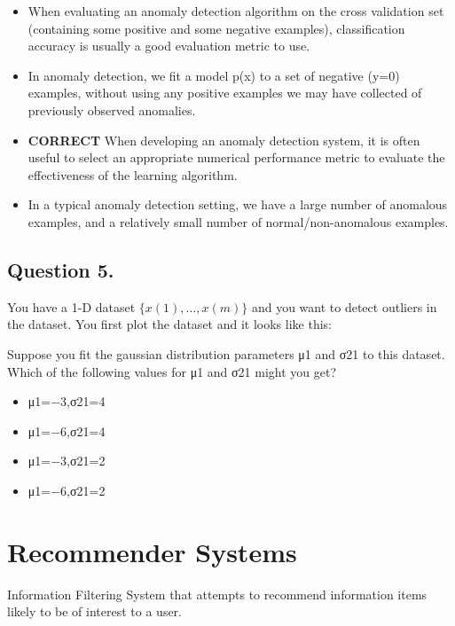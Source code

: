 \documentclass[11pt]{article} %
\begin{document}
\begin{itemize}
	\item When evaluating an anomaly detection algorithm on the cross validation set (containing some positive and some negative examples), classification accuracy is usually a good evaluation metric to use.
	\item  In anomaly detection, we fit a model p(x) to a set of negative (y=0) examples, without using any positive examples we may have collected of previously observed anomalies.
	\item \textbf{CORRECT} When developing an anomaly detection system, it is often useful to select an appropriate numerical performance metric to evaluate the effectiveness of the learning algorithm.
	\item In a typical anomaly detection setting, we have a large number of anomalous examples, and a relatively small number of normal/non-anomalous examples.
\end{itemize}
\subsection*{Question 5. }
You have a 1-D dataset $\{x(1),\ldots,x(m)\}$ and you want to detect outliers in the dataset. You first plot the dataset and it looks like this:


Suppose you fit the gaussian distribution parameters μ1 and σ21 to this dataset. Which of the following values for μ1 and σ21 might you get?
\begin{itemize}
	\item μ1=−3,σ21=4
	\item 
	μ1=−6,σ21=4
	\item
	μ1=−3,σ21=2
	\item 
	μ1=−6,σ21=2
\end{itemize}




\section{Recommender Systems}

Information Filtering System that attempts to recommend information items likely
to be of interest to a user.
\end{document}
